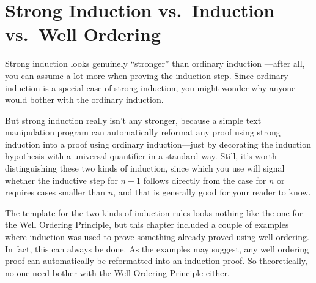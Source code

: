 

\begin{problems}
\practiceproblems
{}

\classproblems
{}

\homeworkproblems
{}

\examproblems
{}

\end{problems}

\section{Strong Induction vs.\ Induction vs.\ Well Ordering}
\label{versusWO}
Strong induction looks genuinely ``stronger'' than ordinary induction
---after all, you can assume a lot more when proving the induction
step.  Since ordinary induction is a special case of strong induction,
you might wonder why anyone would bother with the ordinary induction.

But strong induction really isn't any stronger, because a simple text
manipulation program can automatically reformat any proof using strong
induction into a proof using ordinary induction---just by decorating the
induction hypothesis with a universal quantifier in a standard way.
Still, it's worth distinguishing these two kinds of induction, since which
you use will signal whether the inductive step for $n+1$ follows directly
from the case for $n$ or requires cases smaller than $n$, and that is
generally good for your reader to know.

The template for the two kinds of induction rules looks nothing like
the one for the Well Ordering Principle, but this chapter
included a couple of examples where induction was used to prove
something already proved using well ordering.  In fact, this can
always be done.  As the examples may suggest, any well ordering proof
can automatically be reformatted into an induction proof.  So
theoretically, no one need bother with the Well Ordering Principle
either.

